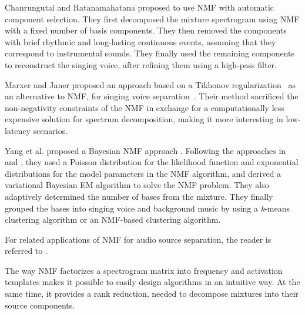 {{Chanrungutai and Ratanamahatana proposed to use NMF with automatic component selection\cite{chanrungutai08}. They first decomposed the mixture spectrogram using NMF with a fixed number of basis components. They then removed the components with brief rhythmic and long-lasting continuous events, assuming that they correspond to instrumental sounds. They finally used the remaining components to reconstruct the singing voice, after refining them using a high-pass filter.

Marxer and Janer proposed an approach based on a Tikhonov regularization~\cite{tikhonov63} as an alternative to NMF, for singing voice separation~\cite{marxer122}. Their method sacrificed the non-negativity constraints of the NMF in exchange for a computationally less expensive solution for spectrum decomposition, making it more interesting in low-latency scenarios.

Yang et al. proposed a Bayesian NMF approach \cite{yang14,chien15}. Following the approaches in \cite{cemgil09} and \cite{schmidt09}, they used a Poisson distribution for the likelihood function and exponential distributions for the model parameters in the NMF algorithm, and derived a variational Bayesian EM  algorithm \cite{dempster77} to solve the NMF problem. They also adaptively determined the number of bases from the mixture. They finally grouped the bases into singing voice and background music by using a \textit{k}-means clustering algorithm \cite{spiertz09} or an NMF-based clustering algorithm.


For related applications of NMF for audio source separation, the reader is referred to \cite{virtanen07,fevotte09}.

\par
The way NMF factorizes a spectrogram matrix into frequency and activation templates makes it possible to easily design algorithms in an intuitive way. At the same time, it provides a rank reduction, needed to decompose mixtures into their source components.


}}
